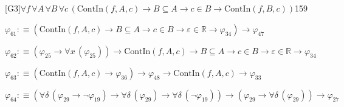 \begin{fullproof}{[G3]}{$\forall f\,\forall A\,\forall B\,\forall c\,(\mathrm{ContIn}(f,A,c) \to B \subseteq A \to c \in B \to \mathrm{ContIn}(f,B,c))$}{159}
\begin{abbrevlist}
\item $\varphi_{61} :\equiv (\mathrm{ContIn}(f,A,c) \to B \subseteq A \to c \in B \to \varepsilon \in \mathbb{R} \to \varphi_{34}) \to \varphi_{47}$
\item $\varphi_{62} :\equiv (\varphi_{25} \to \forall x\,(\varphi_{25})) \to \mathrm{ContIn}(f,A,c) \to B \subseteq A \to c \in B \to \varepsilon \in \mathbb{R} \to \varphi_{34}$
\item $\varphi_{63} :\equiv (\mathrm{ContIn}(f,A,c) \to \varphi_{36}) \to \varphi_{48} \to \mathrm{ContIn}(f,A,c) \to \varphi_{33}$
\item $\varphi_{64} :\equiv (\forall \delta\,(\varphi_{29} \to \neg \varphi_{19}) \to \forall \delta\,(\varphi_{29}) \to \forall \delta\,(\neg \varphi_{19})) \to (\varphi_{29} \to \forall \delta\,(\varphi_{29})) \to \varphi_{27}$
\end{abbrevlist}
\end{fullproof}
